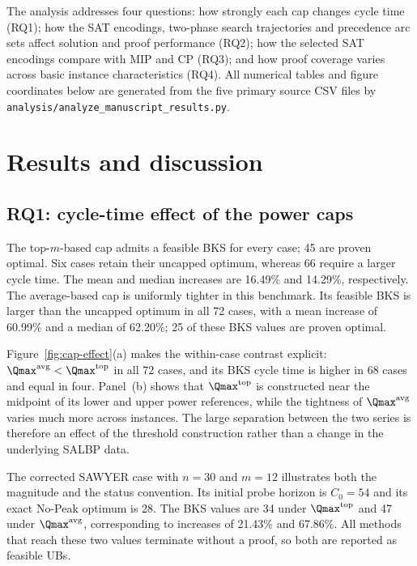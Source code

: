 The analysis addresses four questions: how strongly each cap changes cycle
time (RQ1); how the SAT encodings, two-phase search trajectories and
precedence arc sets affect solution and proof performance (RQ2); how the
selected SAT encodings compare with MIP and CP (RQ3); and how proof coverage
varies across basic instance characteristics (RQ4). All numerical tables and
figure coordinates below are generated from the five primary source CSV files by
\texttt{analysis/analyze\_manuscript\_results.py}.

\section{Results and discussion}

\subsection{RQ1: cycle-time effect of the power caps}



The top-\(m\)-based cap admits a feasible BKS for every case; 45 are proven
optimal. Six cases retain their uncapped optimum, whereas 66 require a larger
cycle time. The mean and median increases are 16.49\% and 14.29\%,
respectively. The average-based cap is uniformly tighter in this benchmark.
Its feasible BKS is larger than the uncapped optimum in all 72 cases, with a
mean increase of 60.99\% and a median of 62.20\%; 25 of these BKS values are
proven optimal.



Figure~\ref{fig:cap-effect}(a) makes the within-case contrast explicit:
\(\Qmax^{\mathrm{avg}}<\Qmax^{\mathrm{top}}\) in all 72 cases, and its BKS
cycle time is higher in 68 cases and equal in four. Panel~(b) shows that
\(\Qmax^{\mathrm{top}}\) is constructed near the midpoint of its lower and
upper power references, while the tightness of \(\Qmax^{\mathrm{avg}}\)
varies much more across instances. The large separation between the two
series is therefore an effect of the threshold construction rather than a
change in the underlying SALBP data.

The corrected SAWYER case with \(n=30\) and \(m=12\) illustrates both the
magnitude and the status convention. Its initial probe horizon is \(C_0=54\)
and its exact No-Peak optimum is 28. The BKS values are 34 under
\(\Qmax^{\mathrm{top}}\) and 47 under \(\Qmax^{\mathrm{avg}}\), corresponding
to increases of 21.43\% and 67.86\%. All methods that reach these two values
terminate without a proof, so both are reported as feasible UBs.

